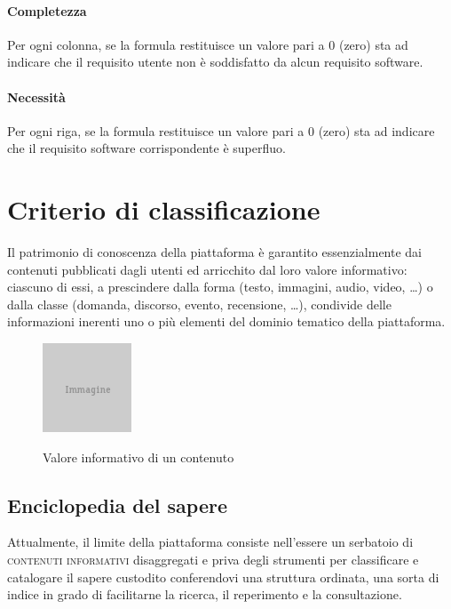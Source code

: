 \paragraph{Completezza} Per ogni colonna, se la formula restituisce un valore pari a 0 (zero) sta ad indicare che il requisito utente non è soddisfatto da alcun requisito software.

\paragraph{Necessità} Per ogni riga, se la formula restituisce un valore pari a 0 (zero) sta ad indicare che il requisito software corrispondente è superfluo.

\section{Criterio di classificazione}
\label{sec:tesi:stage:criterio-classificazione}
Il patrimonio di conoscenza della piattaforma è garantito essenzialmente dai contenuti pubblicati dagli utenti ed arricchito dal loro valore informativo: ciascuno di essi, a prescindere dalla forma (testo, immagini, audio, video, \ldots) o dalla classe (domanda, discorso, evento, recensione, \ldots), condivide delle informazioni inerenti uno o più elementi del dominio tematico della piattaforma.

\begin{figure}[ht]
\begin{center}
 \includegraphics{placeholder.png}
 \label{fig:tesi:stage:classificazione:serbatoio-contenuti}
 \caption{Valore informativo di un contenuto}
\end{center}
\end{figure}

\subsection{Enciclopedia del sapere}
Attualmente, il limite della piattaforma consiste nell'essere un serbatoio di \textsc{contenuti informativi} disaggregati e priva degli strumenti per classificare e catalogare il sapere custodito conferendovi una struttura ordinata, una sorta di indice in grado di facilitarne la ricerca, il reperimento e la consultazione.

